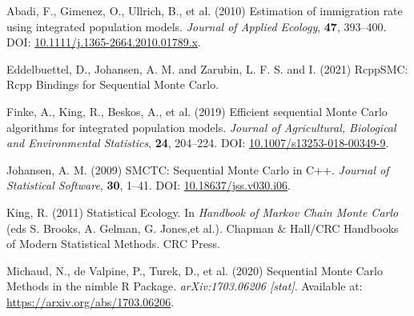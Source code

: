 \documentclass[
  10pt,
  a4paper,
]{article}
\newlength{\cslhangindent}
\newlength{\cslentryspacingunit} %
\newenvironment{CSLReferences}[2] %
 {%
  \setlength{\parindent}{0pt}
  \ifodd #1
  \let\oldpar\par
  \def\par{\hangindent=\cslhangindent\oldpar}
  \fi
  \setlength{\parskip}{#2\cslentryspacingunit}
 }%
 {}
\begin{document}
\hypertarget{refs}{}
\begin{CSLReferences}{1}{0}
\leavevmode{}%
Abadi, F., Gimenez, O., Ullrich, B., et al. (2010) Estimation of
immigration rate using integrated population models. \emph{Journal of
Applied Ecology}, \textbf{47}, 393--400. DOI:
\href{https://doi.org/10.1111/j.1365-2664.2010.01789.x}{10.1111/j.1365-2664.2010.01789.x}.

\leavevmode{}%
Eddelbuettel, D., Johansen, A. M. and Zarubin, L. F. S. and I. (2021)
{RcppSMC}: {Rcpp Bindings} for {Sequential Monte Carlo}.

\leavevmode{}%
Finke, A., King, R., Beskos, A., et al. (2019) Efficient sequential
{Monte Carlo} algorithms for integrated population models. \emph{Journal
of Agricultural, Biological and Environmental Statistics}, \textbf{24},
204--224. DOI:
\href{https://doi.org/10.1007/s13253-018-00349-9}{10.1007/s13253-018-00349-9}.

\leavevmode{}%
Johansen, A. M. (2009) {SMCTC}: {Sequential Monte Carlo} in {C}++.
\emph{Journal of Statistical Software}, \textbf{30}, 1--41. DOI:
\href{https://doi.org/10.18637/jss.v030.i06}{10.18637/jss.v030.i06}.

\leavevmode{}%
King, R. (2011) Statistical {Ecology}. In \emph{Handbook of {Markov
Chain Monte Carlo}} (eds S. Brooks, A. Gelman, G. Jones,et al.). Chapman
{\(\&\)} {Hall}/{CRC Handbooks} of {Modern Statistical Methods}. {CRC
Press}.

\leavevmode{}%
Michaud, N., de Valpine, P., Turek, D., et al. (2020) Sequential {Monte
Carlo Methods} in the nimble {R Package}. \emph{arXiv:1703.06206
{[}stat{]}}. Available at: \url{https://arxiv.org/abs/1703.06206}.

\end{CSLReferences}
\end{document}
